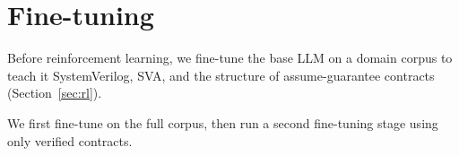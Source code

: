 \section{Fine-tuning}
\label{sec:finetuning}

Before reinforcement learning, we fine-tune the base LLM on a domain corpus to teach it SystemVerilog, SVA, and the structure of assume-guarantee contracts (Section~\ref{sec:rl}).

We first fine-tune on the full corpus, then run a second fine-tuning stage using
only verified contracts.
